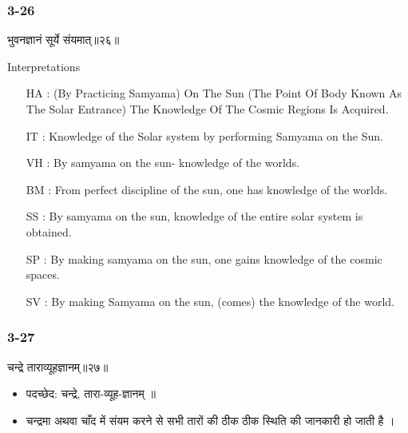 \begin{frame}[fragile]\frametitle{3-26}
\begin{sanskrit}
भुवनज्ञानं सूर्ये संयमात्॥२६॥
\end{sanskrit}

Interpretations
\begin{itemize}	
\item [HA]: (By Practicing Samyama) On The Sun (The Point Of Body Known As The Solar Entrance) The Knowledge Of The Cosmic Regions Is Acquired.
\item [IT]: Knowledge of the Solar system by performing Samyama on the Sun.
\item [VH]: By samyama on the sun- knowledge of the worlds.
\item [BM]: From perfect discipline of the sun, one has knowledge of the worlds.
\item [SS]: By samyama on the sun, knowledge of the entire solar system is obtained.
\item [SP]: By making samyama on the sun, one gains knowledge of the cosmic spaces.
\item [SV]: By making Samyama on the sun, (comes) the knowledge of the world. 
\end{itemize}
\end{frame}

\begin{frame}[fragile]\frametitle{3-27}
\begin{sanskrit}
चन्द्रे ताराव्यूहज्ञानम्॥२७॥
\end{sanskrit}

\begin{itemize}
\item पदच्छेद:  चन्द्रे, तारा-व्यूह-ज्ञानम् ॥
\item चन्द्रमा अथवा चाँद में संयम करने से सभी तारों की ठीक ठीक स्थिति की जानकारी हो जाती है ।
\end{itemize}
\end{frame}

